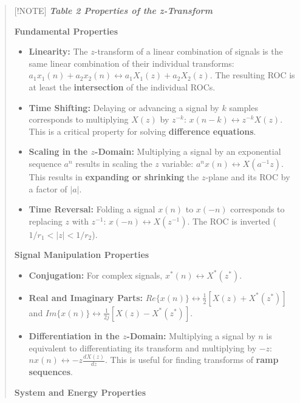 \begin{quote}
{[}!NOTE{]} \textbf{\emph{Table 2 Properties of the z-Transform}}

\textbf{Fundamental Properties}

\begin{itemize}
\tightlist
\item
  \textbf{Linearity:} The \(z\)-transform of a linear combination of
  signals is the same linear combination of their individual transforms:
  \(a_1x_1(n) + a_2x_2(n) \leftrightarrow a_1X_1(z) + a_2X_2(z)\). The
  resulting ROC is at least the \textbf{intersection} of the individual
  ROCs.
\item
  \textbf{Time Shifting:} Delaying or advancing a signal by \(k\)
  samples corresponds to multiplying \(X(z)\) by \(z^{-k}\):
  \(x(n - k) \leftrightarrow z^{-k}X(z)\). This is a critical property
  for solving \textbf{difference equations}.
\item
  \textbf{Scaling in the \(z\)-Domain:} Multiplying a signal by an
  exponential sequence \(a^n\) results in scaling the \(z\) variable:
  \(a^nx(n) \leftrightarrow X(a^{-1}z)\). This results in
  \textbf{expanding or shrinking} the \(z\)-plane and its ROC by a
  factor of \(|a|\).
\item
  \textbf{Time Reversal:} Folding a signal \(x(n)\) to \(x(-n)\)
  corresponds to replacing \(z\) with \(z^{-1}\):
  \(x(-n) \leftrightarrow X(z^{-1})\). The ROC is inverted
  (\(1/r_1 < |z| < 1/r_2\)).
\end{itemize}

\textbf{Signal Manipulation Properties}

\begin{itemize}
\tightlist
\item
  \textbf{Conjugation:} For complex signals,
  \(x^*(n) \leftrightarrow X^*(z^*)\).
\item
  \textbf{Real and Imaginary Parts:}
  \(Re\{x(n)\} \leftrightarrow \frac{1}{2}[X(z) + X^*(z^*)]\) and
  \(Im\{x(n)\} \leftrightarrow \frac{1}{2j}[X(z) - X^*(z^*)]\).
\item
  \textbf{Differentiation in the \(z\)-Domain:} Multiplying a signal by
  \(n\) is equivalent to differentiating its transform and multiplying
  by \(-z\): \(nx(n) \leftrightarrow -z \frac{dX(z)}{dz}\). This is
  useful for finding transforms of \textbf{ramp sequences}.
\end{itemize}

\textbf{System and Energy Properties}


\end{quote}
